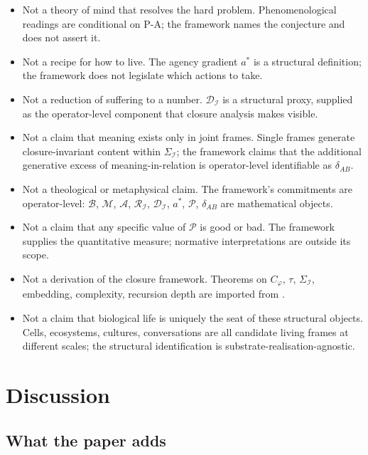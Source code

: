 \documentclass[11pt]{article}
\theoremstyle{plain}
\theoremstyle{definition}
\theoremstyle{remark}
\newcommand{\Ical}{\mathcal{I}}
\newcommand{\Mcal}{\mathcal{M}}
\newcommand{\Acal}{\mathcal{A}}
\newcommand{\Bcal}{\mathcal{B}}
\newcommand{\Rcal}{\mathcal{R}}
\newcommand{\Dcal}{\mathcal{D}}
\newcommand{\Pcal}{\mathcal{P}}
\newcommand{\Cph}{C_\varphi}
\begin{document}
\begin{itemize}[leftmargin=2em]
\item Not a theory of mind that resolves the hard problem. Phenomenological readings are conditional on P-A; the framework names the conjecture and does not assert it.
\item Not a recipe for how to live. The agency gradient $a^*$ is a structural definition; the framework does not legislate which actions to take.
\item Not a reduction of suffering to a number. $\Dcal_\Ical$ is a structural proxy, supplied as the operator-level component that closure analysis makes visible.
\item Not a claim that meaning exists only in joint frames. Single frames generate closure-invariant content within $\Sigma_\Ical$; the framework claims that the additional generative excess of meaning-in-relation is operator-level identifiable as $\delta_{AB}$.
\item Not a theological or metaphysical claim. The framework's commitments are operator-level: $\Bcal$, $\Mcal$, $\Acal$, $\Rcal_\Ical$, $\Dcal_\Ical$, $a^*$, $\Pcal$, $\delta_{AB}$ are mathematical objects.
\item Not a claim that any specific value of $\Pcal$ is good or bad. The framework supplies the quantitative measure; normative interpretations are outside its scope.
\item Not a derivation of the closure framework. Theorems on $\Cph$, $\tau$, $\Sigma_\Ical$, embedding, complexity, recursion depth are imported from \citet{SmartExistenceClosure}.
\item Not a claim that biological life is uniquely the seat of these structural objects. Cells, ecosystems, cultures, conversations are all candidate living frames at different scales; the structural identification is substrate-realisation-agnostic.
\end{itemize}

\section{Discussion}\label{sec:discussion}

\subsection{What the paper adds}
\end{document}

